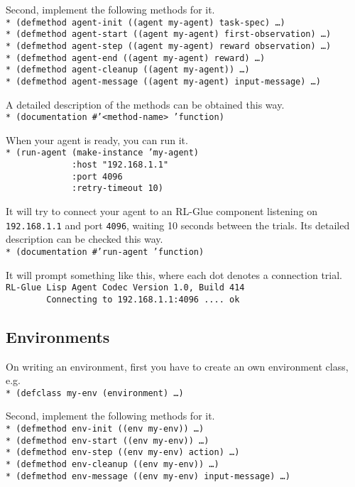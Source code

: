 \documentclass[11pt,a4paper,dvipdfm]{article}
\newcommand{\prompttext}[1]{\texttt{#1}}
\newcommand{\lispprompt}[1]{\prompttext{* #1}}
\begin{document}
Second, implement the following methods for it. \\
\lispprompt{(defmethod agent-init ((agent my-agent) task-spec) \ldots)} \\
\lispprompt{(defmethod agent-start ((agent my-agent) first-observation) \ldots)} \\
\lispprompt{(defmethod agent-step ((agent my-agent) reward observation) \ldots)} \\
\lispprompt{(defmethod agent-end ((agent my-agent) reward) \ldots)} \\
\lispprompt{(defmethod agent-cleanup ((agent my-agent)) \ldots)} \\
\lispprompt{(defmethod agent-message ((agent my-agent) input-message) \ldots)}

A detailed description of the methods can be obtained this way. \\
\lispprompt{(documentation \#'<method-name> 'function)}

When your agent is ready, you can run it. \\
\lispprompt{(run-agent (make-instance 'my-agent) \\
\mbox{~~~~~~~~~~~~~}:host "192.168.1.1" \\
\mbox{~~~~~~~~~~~~~}:port 4096 \\
\mbox{~~~~~~~~~~~~~}:retry-timeout 10)}

It will try to connect your agent to an RL-Glue component listening on
\prompttext{192.168.1.1} and port \prompttext{4096}, waiting 10 seconds
between the trials. Its detailed description can be checked this way. \\
\lispprompt{(documentation \#'run-agent 'function)}

It will prompt something like this, where each dot denotes a connection
trial. \\
\prompttext{RL-Glue Lisp Agent Codec Version 1.0, Build 414} \\
\prompttext{\mbox{~~~~~~~~}Connecting to 192.168.1.1:4096 ....~ok}

\subsection{Environments}

On writing an environment, first you have to create an own environment class,
e.g. \\
\lispprompt{(defclass my-env (environment) \ldots)}

Second, implement the following methods for it. \\
\lispprompt{(defmethod env-init ((env my-env)) \ldots)} \\
\lispprompt{(defmethod env-start ((env my-env)) \ldots)} \\
\lispprompt{(defmethod env-step ((env my-env) action) \ldots)} \\
\lispprompt{(defmethod env-cleanup ((env my-env)) \ldots)} \\
\lispprompt{(defmethod env-message ((env my-env) input-message) \ldots)}
\end{document}
